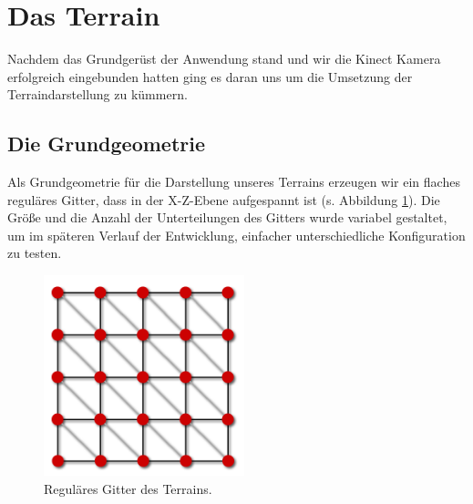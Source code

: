 \section{Das Terrain}
\begin{Spacing}{\mylinespace}

Nachdem das Grundgerüst der Anwendung stand und wir die Kinect Kamera erfolgreich eingebunden hatten ging es daran uns um die Umsetzung der Terraindarstellung zu kümmern.

\subsection{Die Grundgeometrie}
Als Grundgeometrie für die Darstellung unseres Terrains erzeugen wir ein flaches reguläres Gitter, dass in der X-Z-Ebene aufgespannt ist (s. Abbildung \ref{fig:grid}). Die Größe und die Anzahl der Unterteilungen des Gitters wurde variabel gestaltet, um im späteren Verlauf der Entwicklung, einfacher unterschiedliche Konfiguration zu testen. 

\begin{figure}[h!]
	\centering
	\vspace*{10px}
	\includegraphics[width=220px]{graphics/grid.png}
	\caption{Reguläres Gitter des Terrains.}
	\label{fig:grid}
\end{figure}


\end{Spacing}
